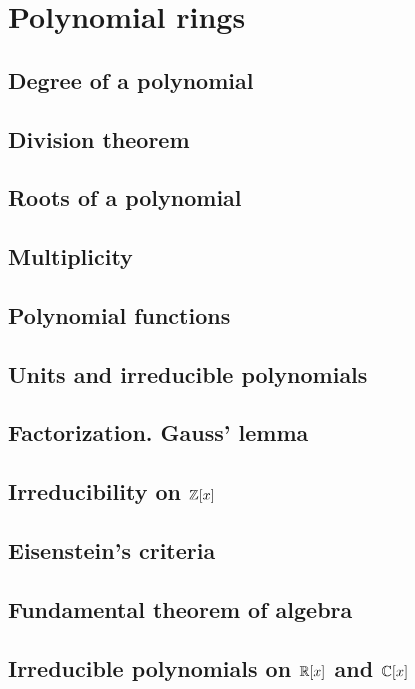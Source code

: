 \chapter{Polynomial rings}
\thispagestyle{noheaders}

\section{Degree of a polynomial}
\section{Division theorem}
\section{Roots of a polynomial}
\section{Multiplicity}
\section{Polynomial functions}
\section{Units and irreducible polynomials}
\section{Factorization. Gauss' lemma}
\section{Irreducibility on $\Z[x]$}
\section{Eisenstein's criteria}
\section{Fundamental theorem of algebra}
\section{Irreducible polynomials on $\R[x]$ and $\C[x]$}
